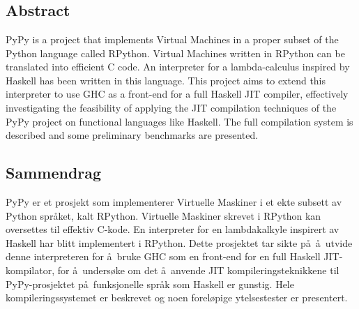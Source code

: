 
\chapter*{}

\section*{Abstract}

PyPy is a project that implements Virtual Machines in a proper subset of
the Python language called RPython. Virtual Machines written in RPython
can be translated into efficient C code. An interpreter for a lambda-calculus inspired by
Haskell has been written in this language.
This project aims to extend this interpreter to use GHC as a front-end for
a full Haskell JIT compiler, effectively investigating the feasibility
of applying the JIT compilation techniques of the PyPy project on functional
languages like Haskell.
The full compilation system is described and some preliminary benchmarks are
presented.

\section*{Sammendrag}

PyPy er et prosjekt som implementerer Virtuelle Maskiner i et ekte subsett av
Python spr\aa ket, kalt RPython. Virtuelle Maskiner skrevet i RPython
kan oversettes til effektiv C-kode. En interpreter for en lambdakalkyle inspirert av
Haskell har blitt implementert i RPython.
Dette prosjektet tar sikte p\aa \ \aa \ utvide denne interpreteren for \aa \ bruke GHC 
som en front-end for
en full Haskell JIT-kompilator, for \aa \ unders\o ke om det
\aa \ anvende JIT kompileringsteknikkene til PyPy-prosjektet p\aa \ funksjonelle
spr\aa k som Haskell er gunstig.
Hele kompileringssystemet er beskrevet og noen foreløpige ytelsestester er presentert.
